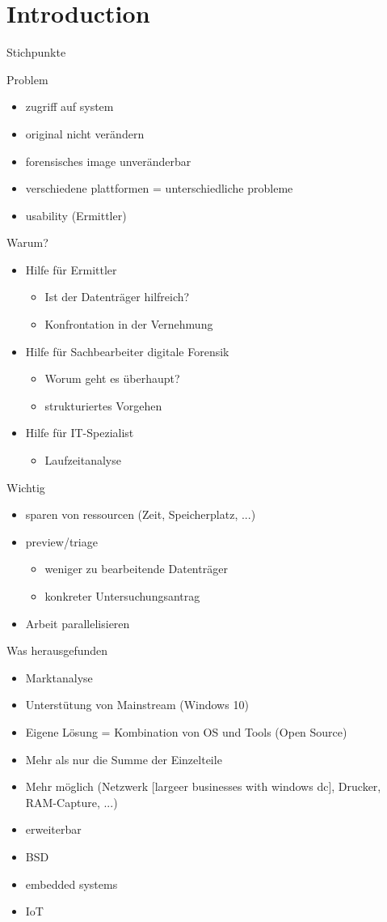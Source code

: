 \chapter{Introduction}
Stichpunkte

Problem
\begin{itemize}
\item zugriff auf system
\item original nicht verändern
\item forensisches image unveränderbar
\item verschiedene plattformen = unterschiedliche probleme
\item usability (Ermittler)
\end{itemize}

Warum?
\begin{itemize}
\item Hilfe für Ermittler
\begin{itemize}
  \item Ist der Datenträger hilfreich?
  \item Konfrontation in der Vernehmung
\end{itemize}
\item Hilfe für Sachbearbeiter digitale Forensik
\begin{itemize}
  \item Worum geht es überhaupt?
  \item strukturiertes Vorgehen
\end{itemize}
\item Hilfe für IT-Spezialist
\begin{itemize}
  \item Laufzeitanalyse
\end{itemize}
\end{itemize}

Wichtig
\begin{itemize}
\item sparen von ressourcen (Zeit, Speicherplatz, ...)
\item preview/triage
\begin{itemize}
  \item weniger zu bearbeitende Datenträger
  \item konkreter Untersuchungsantrag
\end{itemize}
\item Arbeit parallelisieren
\end{itemize}

Was herausgefunden
\begin{itemize}
\item Marktanalyse
\item Unterstütung von Mainstream (Windows 10)
\item Eigene Lösung = Kombination von OS und Tools (Open Source)
\item Mehr als nur die Summe der Einzelteile
\item Mehr möglich (Netzwerk [largeer businesses with windows dc], Drucker, RAM-Capture, ...)
\item erweiterbar
\item BSD
\item embedded systems
\item IoT
\end{itemize}

